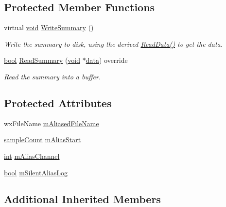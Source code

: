 \subsection*{Protected Member Functions}
\begin{DoxyCompactItemize}
\item 
virtual \hyperlink{sound_8c_ae35f5844602719cf66324f4de2a658b3}{void} \hyperlink{class_alias_block_file_a0ffabad5ed7a43d188d56db822a9421a}{Write\+Summary} ()
\begin{DoxyCompactList}\small\item\em Write the summary to disk, using the derived \hyperlink{class_block_file_ad1355b9c8421a6f1a6b6d8cf3d3f073e}{Read\+Data()} to get the data. \end{DoxyCompactList}\item 
\hyperlink{mac_2config_2i386_2lib-src_2libsoxr_2soxr-config_8h_abb452686968e48b67397da5f97445f5b}{bool} \hyperlink{class_alias_block_file_a7f30a5da5964e3dfbd35657f3bacbf9b}{Read\+Summary} (\hyperlink{sound_8c_ae35f5844602719cf66324f4de2a658b3}{void} $\ast$\hyperlink{lib_2expat_8h_ac39e72a1de1cb50dbdc54b08d0432a24}{data}) override
\begin{DoxyCompactList}\small\item\em Read the summary into a buffer. \end{DoxyCompactList}\end{DoxyCompactItemize}
\subsection*{Protected Attributes}
\begin{DoxyCompactItemize}
\item 
wx\+File\+Name \hyperlink{class_alias_block_file_a8c098b2f0b168462fcaa45a6dad4682c}{m\+Aliased\+File\+Name}
\item 
\hyperlink{include_2audacity_2_types_8h_afa427e1f521ea5ec12d054e8bd4d0f71}{sample\+Count} \hyperlink{class_alias_block_file_a25ce7e8f04c9bc5300395c4eb4ebd5f4}{m\+Alias\+Start}
\item 
\hyperlink{xmltok_8h_a5a0d4a5641ce434f1d23533f2b2e6653}{int} \hyperlink{class_alias_block_file_afe28fdf0e410949f7957c8bab52358df}{m\+Alias\+Channel}
\item 
\hyperlink{mac_2config_2i386_2lib-src_2libsoxr_2soxr-config_8h_abb452686968e48b67397da5f97445f5b}{bool} \hyperlink{class_alias_block_file_a5c0cb39191f74e9941bd614fbd5d9a35}{m\+Silent\+Alias\+Log}
\end{DoxyCompactItemize}
\subsection*{Additional Inherited Members}


